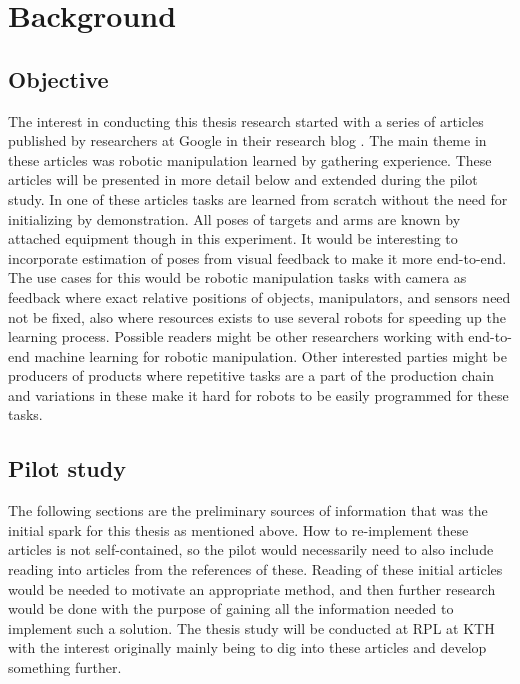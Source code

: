 \section{Background}

\subsection{Objective}

The interest in conducting this thesis research started with a series of
articles published by researchers at Google in their research blog
\cite{gu2016deep,finn2016deep,yahya2016collective,chebotar2016path}. The main
theme in these articles was robotic manipulation learned by gathering
experience. These articles will be presented in more detail below and extended
during the pilot study. In one of these articles tasks are learned from scratch without
the need for initializing by demonstration. All poses of targets and arms are
known by attached equipment though in this experiment. It would be interesting
to incorporate estimation of poses from visual feedback to make it more
end-to-end. The use cases for this would be robotic manipulation tasks with
camera as feedback where exact relative positions of objects, manipulators, and
sensors need not be fixed, also where resources exists to use several robots
for speeding up the learning process. Possible readers might be other
researchers working with end-to-end machine learning for robotic manipulation.
Other interested parties might be producers of products where repetitive tasks
are a part of the production chain and variations in these make it hard for
robots to be easily programmed for these tasks.

\subsection{Pilot study}

The following sections are the preliminary sources of information that was the
initial spark for this thesis as mentioned above. How to re-implement these
articles is not self-contained, so the pilot would necessarily need to also
include reading into articles from the references of these. Reading of these
initial articles would be needed to motivate an appropriate method, and then
further research would be done with the purpose of gaining all the information
needed to implement such a solution. The thesis study will be conducted at RPL
at KTH with the interest originally mainly being to dig into these articles and
develop something further.

